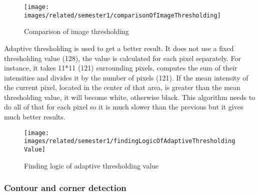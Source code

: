 \documentclass[../../main.tex]{subfiles}
\begin{document}
\begin{figure} [ht]
\begin{center}
\texttt{[image: images/related/semester1/comparisonOfImageThresholding]}
\caption{Comparison of image thresholding}
\label{fig:comparisonOfImageThresholding}
\end{center}
\end{figure}

Adaptive thresholding is used to get a better result. It does not use a fixed thresholding value (128), the value is calculated for each pixel separately. For instance, it takes 11*11 (121) surrounding pixels, computes the sum of their intensities and divides it by the number of pixels (121). If the mean intensity of the current pixel, located in the center of that area, is greater than the mean thresholding value, it will become white, otherwise black. This algorithm needs to do all of that for each pixel so it is much slower than the previous but it gives much better results.

\begin{figure} [ht]
\begin{center}
\texttt{[image: images/related/semester1/findingLogicOfAdaptiveThresholdingValue]}
\caption{Finding logic of adaptive thresholding value}
\label{fig:findingLogicOfAdaptiveThresholdingValue}
\end{center}
\end{figure}

\subsubsection{Contour and corner detection}
\end{document}
